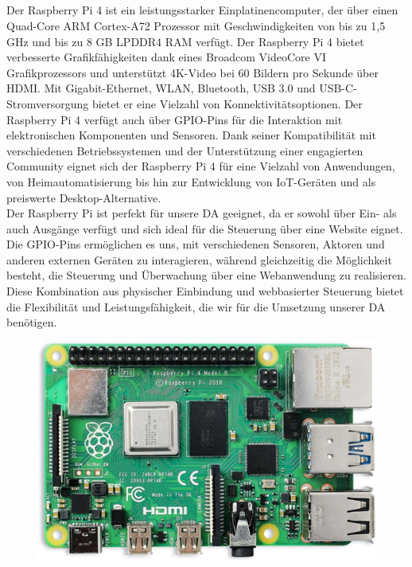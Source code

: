 \subsection{\raspi}\label{sec:raspi}
Der Raspberry Pi 4\autocite{Raspberry} ist ein leistungsstarker Einplatinencomputer, der über einen Quad-Core ARM Cortex-A72 Prozessor mit Geschwindigkeiten von bis zu 1,5 GHz und bis zu 8 GB LPDDR4 RAM verfügt. Der Raspberry Pi 4 bietet verbesserte Grafikfähigkeiten dank eines Broadcom VideoCore VI Grafikprozessors und unterstützt 4K-Video bei 60 Bildern pro Sekunde über HDMI. Mit Gigabit-Ethernet, WLAN, Bluetooth, USB 3.0 und USB-C-Stromversorgung bietet er eine Vielzahl von Konnektivitätsoptionen. Der Raspberry Pi 4 verfügt auch über GPIO-Pins für die Interaktion mit elektronischen Komponenten und Sensoren. Dank seiner Kompatibilität mit verschiedenen Betriebssystemen und der Unterstützung einer engagierten Community eignet sich der Raspberry Pi 4 für eine Vielzahl von Anwendungen, von Heimautomatisierung bis hin zur Entwicklung von IoT-Geräten und als preiswerte Desktop-Alternative.\\
\vspace{5mm}
Der Raspberry Pi ist perfekt für unsere DA geeignet, da er sowohl über Ein- als auch Ausgänge verfügt und sich ideal für die Steuerung über eine Website eignet. Die GPIO-Pins ermöglichen es uns, mit verschiedenen Sensoren, Aktoren und anderen externen Geräten zu interagieren, während gleichzeitig die Möglichkeit besteht, die Steuerung und Überwachung über eine Webanwendung zu realisieren. Diese Kombination aus physischer Einbindung und webbasierter Steuerung bietet die Flexibilität und Leistungsfähigkeit, die wir für die Umsetzung unserer DA benötigen.
\vspace{5mm}
\begin{figure}[H]
    \centering
    \includegraphics[scale=0.8]{image/raspi.png}
    \caption{\raspi}
    \label{fig:enter-label}
\end{figure}